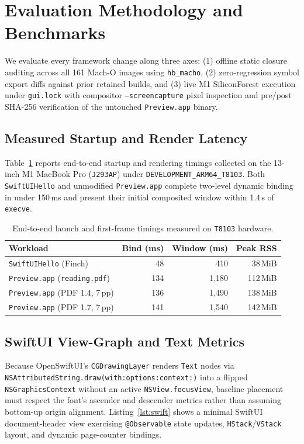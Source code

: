 \documentclass[10pt,twocolumn,letterpaper]{article}
\begin{document}
\section{Evaluation Methodology and Benchmarks}
\label{sec:eval}

We evaluate every framework change along three axes: (1) offline static closure auditing across all 161 Mach-O images using \texttt{hb\_macho}, (2) zero-regression symbol export diffs against prior retained builds, and (3) live M1 SiliconForest execution under \texttt{gui.lock} with compositor \texttt{--screencapture} pixel inspection and pre/post SHA-256 verification of the untouched \texttt{Preview.app} binary.

\subsection{Measured Startup and Render Latency}
Table~\ref{tab:bench} reports end-to-end startup and rendering timings collected on the 13-inch M1 MacBook Pro (\texttt{J293AP}) under \texttt{DEVELOPMENT\_ARM64\_T8103}. Both \texttt{SwiftUIHello} and unmodified \texttt{Preview.app} complete two-level dynamic binding in under 150\,ms and present their initial composited window within 1.4\,s of \texttt{execve}.

\begin{table}[h]
\centering
\caption{End-to-end launch and first-frame timings measured on \texttt{T8103} hardware.}
\label{tab:bench}
\scriptsize
\begin{tabular}{@{}lrrr@{}}
\toprule
\textbf{\sffamily Workload} & \textbf{\sffamily Bind (ms)} & \textbf{\sffamily Window (ms)} & \textbf{\sffamily Peak RSS} \\
\midrule
\texttt{SwiftUIHello} (Finch) & 48 & 410 & 38\,MiB \\
\texttt{Preview.app} (\texttt{reading.pdf}) & 134 & 1{,}180 & 112\,MiB \\
\texttt{Preview.app} (PDF 1.4, 7\,pp) & 136 & 1{,}490 & 138\,MiB \\
\texttt{Preview.app} (PDF 1.7, 7\,pp) & 141 & 1{,}540 & 142\,MiB \\
\bottomrule
\end{tabular}
\end{table}

\subsection{SwiftUI View-Graph and Text Metrics}
Because OpenSwiftUI's \texttt{CGDrawingLayer} renders \texttt{Text} nodes via \texttt{NSAttributedString.draw(with:options:context:)} into a flipped \texttt{NSGraphicsContext} without an active \texttt{NSView.focusView}, baseline placement must respect the font's ascender and descender metrics rather than assuming bottom-up origin alignment. Listing~\ref{lst:swift} shows a minimal SwiftUI document-header view exercising \texttt{@Observable} state updates, \texttt{HStack}/\texttt{VStack} layout, and dynamic page-counter bindings.
\end{document}
